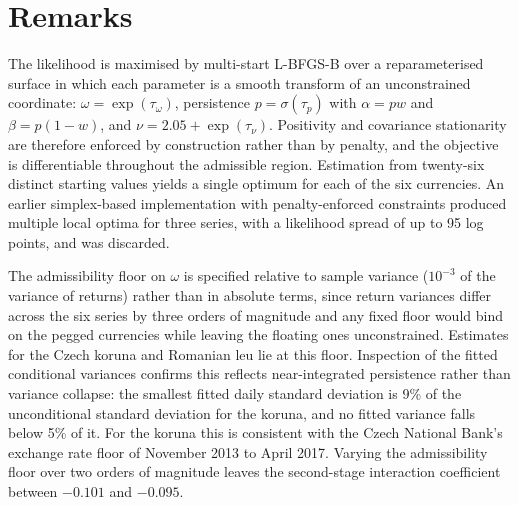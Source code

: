 \section{Remarks}\label{sec:remarks}

The likelihood is maximised by multi-start L-BFGS-B over a reparameterised surface in which each parameter is a smooth transform of an unconstrained coordinate: $\omega = \exp(\tau_\omega)$, persistence $p = \sigma(\tau_p)$ with $\alpha = pw$ and $\beta = p(1-w)$, and $\nu = 2.05 + \exp(\tau_\nu)$. Positivity and covariance stationarity are therefore enforced by construction rather than by penalty, and the objective is differentiable throughout the admissible region. Estimation from twenty-six distinct starting values yields a single optimum for each of the six currencies. An earlier simplex-based implementation with penalty-enforced constraints produced multiple local optima for three series, with a likelihood spread of up to 95 log points, and was discarded.

The admissibility floor on $\omega$ is specified relative to sample variance ($10^{-3}$ of the variance of returns) rather than in absolute terms, since return variances differ across the six series by three orders of magnitude and any fixed floor would bind on the pegged currencies while leaving the floating ones unconstrained. Estimates for the Czech koruna and Romanian leu lie at this floor. Inspection of the fitted conditional variances confirms this reflects near-integrated persistence rather than variance collapse: the smallest fitted daily standard deviation is 9\% of the unconditional standard deviation for the koruna, and no fitted variance falls below 5\% of it. For the koruna this is consistent with the Czech National Bank's exchange rate floor of November 2013 to April 2017. Varying the admissibility floor over two orders of magnitude leaves the second-stage interaction coefficient between $-0.101$ and $-0.095$.



